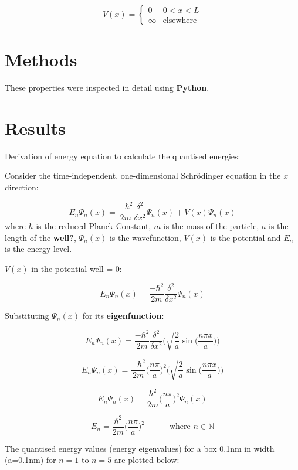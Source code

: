 \[
  V(x) = \begin{cases}
  0 & 0 < x < L\\
  \infty & \text{elsewhere}
\end{cases}
\]

\section{Methods}
   
These properties were inspected in detail using \textbf{Python}.
   
\section{Results}

Derivation of energy equation to calculate the quantised energies:

Consider the time-independent, one-dimensional Schrödinger equation in the $x$ direction:

$$E_n \Psi_n (x) = \frac{-\hbar ^{2}}{2m}\frac{\delta^{2}}{\delta x^{2}}\Psi_n (x) + V(x)\Psi_n (x)$$
where $\hbar$ is the reduced Planck Constant, $m$ is the mass of the particle, $a$ is the length of the \textbf{well?}, $\Psi_n (x)$ is the wavefunction, $V(x)$ is the potential and $E_n$ is the energy level. 

$V(x)$ in the potential well = 0: 

\begin{equation} \label{eq:1}
E_n \Psi_n (x) = \frac{-\hbar ^{2}}{2m}\frac{\delta^{2}}{\delta x^{2}}\Psi_n (x)
\end{equation}


Substituting $\Psi_n (x)$ for its \textbf{eigenfunction}:

$$E_n \Psi_n (x) = \frac{-\hbar ^{2}}{2m}\frac{\delta^{2}}{\delta x^{2}}\Bigg(\sqrt{\frac{2}{a}}\sin\Big(\frac{n\pi x}{a}\Big)\Bigg)$$

$$E_n \Psi_n (x) = \frac{-\hbar ^{2}}{2m}\Big(\frac{n\pi}{a}\Big)^{2}\Bigg(\sqrt{\frac{2}{a}}\sin\Big(\frac{n\pi x}{a}\Big)\Bigg)$$

$$E_n \Psi_n (x) = \frac{\hbar ^{2}}{2m}\Big(\frac{n\pi}{a}\Big)^{2}\Psi_n (x)$$

$$E_n = \frac{\hbar ^{2}}{2m}\Big(\frac{n\pi}{a}\Big)^{2} \quad \quad \quad \text{where } n \in \mathbb{N}$$

The quantised energy values (energy eigenvalues) for a box 0.1nm in width (a=0.1nm) for $n=1$ to $n=5$ are plotted below:


